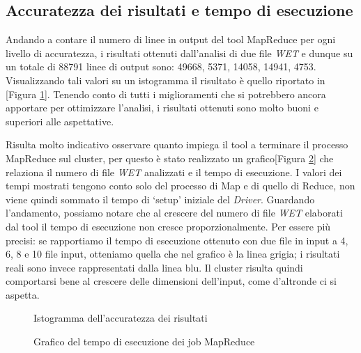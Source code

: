 \documentclass{article}
\newcommand{\MR}{MapReduce}
\newcommand{\WET}{\textit{WET}}
\newcommand{\imgref}[1]{[Figura \ref{#1}]}
\begin{document}
\subsection{Accuratezza dei risultati e tempo di esecuzione}
Andando a contare il numero di linee in output del tool \MR{} per ogni livello di accuratezza, i risultati ottenuti dall'analisi di due file \WET{} e dunque su un totale di 88791 linee di output sono: 49668\imgtick{}, 5371\imgx{}, 14058\imgplus{}, 14941\imgminus{}, 4753\imgdivided{}. Visualizzando tali valori su un istogramma il risultato è quello riportato in \imgref{graph:histogram}. Tenendo conto di tutti i miglioramenti che si potrebbero ancora apportare per ottimizzare l'analisi, i risultati ottenuti sono molto buoni e superiori alle aspettative.

Risulta molto indicativo osservare quanto impiega il tool a terminare il processo \MR{} sul cluster, per questo è stato realizzato un grafico\imgref{graph:points} che relaziona il numero di file \WET{} analizzati e il tempo di esecuzione. I valori dei tempi mostrati tengono conto solo del processo di Map e di quello di Reduce, non viene quindi sommato il tempo di `setup' iniziale del \textit{Driver}. Guardando l'andamento, possiamo notare che al crescere del numero di file \WET{} elaborati dal tool il tempo di esecuzione non cresce proporzionalmente. Per essere più precisi: se rapportiamo il tempo di esecuzione ottenuto con due file in input a 4, 6, 8 e 10 file input, otteniamo quella che nel grafico è la linea grigia; i risultati reali sono invece rappresentati dalla linea blu. Il cluster risulta quindi comportarsi bene al crescere delle dimensioni dell'input, come d'altronde ci si aspetta.

\begin{figure}[h!]
    \centering
    \scalebox{0.9}
    \printHistogram{}
    \caption{Istogramma dell'accuratezza dei risultati}
    \label{graph:histogram}
\end{figure}

\begin{figure}[h!]
    \centering
    \scalebox{0.9}
    \printTimeGraph{}
    \caption{Grafico del tempo di esecuzione dei job \MR{}}
    \label{graph:points}
\end{figure}

\newpage
\end{document}
